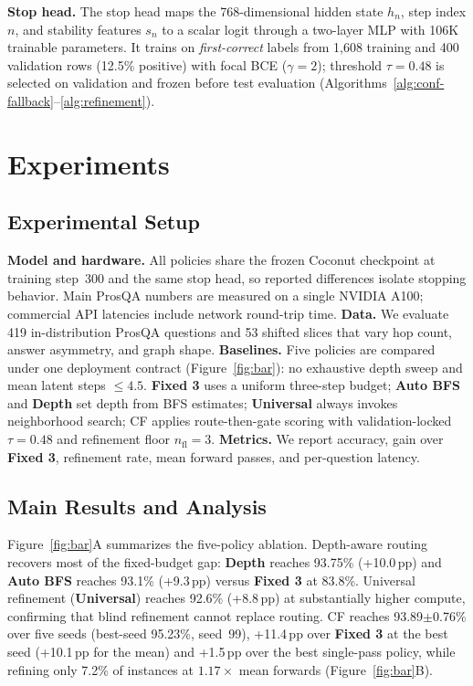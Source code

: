 \documentclass{article}
\theoremstyle{compactthm}
\theoremstyle{compactdef}
\newcommand{\FixedThree}{\textbf{Fixed 3}}
\newcommand{\StructureD}{\textbf{Depth}}
\newcommand{\AutoRoute}{\textbf{Auto BFS}}
\newcommand{\KnnMin}{\textbf{Universal}}
\begin{document}
\vspace{\baselineskip}
\enlargethispage{2\baselineskip}

\vspace{\baselineskip}
\noindent\textbf{Stop head.} The stop head maps the 768-dimensional hidden state $h_n$, step index $n$, and stability features $s_n$ to a scalar logit through a two-layer MLP with 106K trainable parameters. It trains on \emph{first-correct} labels from 1{,}608 training and 400 validation rows (12.5\% positive) with focal BCE \citep{lin2017focal} ($\gamma{=}2$); threshold $\tau{=}0.48$ is selected on validation and frozen before test evaluation (Algorithms~\ref{alg:conf-fallback}--\ref{alg:refinement}).


\section{Experiments}
\label{sec:exp}
\subsection{Experimental Setup}
\noindent\textbf{Model and hardware.} All policies share the frozen Coconut checkpoint at training step~300 \citep{hao2024coconut} and the same stop head, so reported differences isolate stopping behavior. Main ProsQA numbers are measured on a single NVIDIA A100; commercial API latencies include network round-trip time. \textbf{Data.} We evaluate 419 in-distribution ProsQA questions and 53 shifted slices that vary hop count, answer asymmetry, and graph shape. \textbf{Baselines.} Five policies are compared under one deployment contract (Figure~\ref{fig:bar}): no exhaustive depth sweep and mean latent steps $\le 4.5$. \FixedThree{} uses a uniform three-step budget; \AutoRoute{} and \StructureD{} set depth from BFS estimates; \KnnMin{} always invokes neighborhood search; CF applies route-then-gate scoring with validation-locked $\tau{=}0.48$ and refinement floor $n_{\mathrm{fl}}{=}3$. \textbf{Metrics.} We report accuracy, gain over \FixedThree{}, refinement rate, mean forward passes, and per-question latency.

\subsection{Main Results and Analysis}
\label{sec:main}
Figure~\ref{fig:bar}A summarizes the five-policy ablation. Depth-aware routing recovers most of the fixed-budget gap: \StructureD{} reaches 93.75\% (+10.0\,pp) and \AutoRoute{} reaches 93.1\% (+9.3\,pp) versus \FixedThree{} at 83.8\%. Universal refinement (\KnnMin{}) reaches 92.6\% (+8.8\,pp) at substantially higher compute, confirming that blind refinement cannot replace routing. CF reaches 93.89$\pm$0.76\% over five seeds (best-seed 95.23\%, seed~99), +11.4\,pp over \FixedThree{} at the best seed (+10.1\,pp for the mean) and +1.5\,pp over the best single-pass policy, while refining only 7.2\% of instances at $1.17\times$ mean forwards (Figure~\ref{fig:bar}B).
\end{document}
